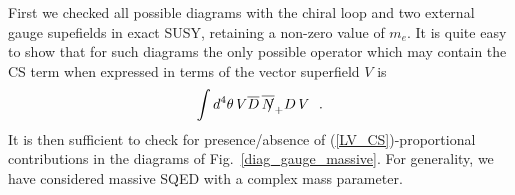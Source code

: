 \documentclass[12pt]{revtex4}
\newcommand{\slashed}[1]{\hbox{{$#1$}\llap{$/$}}}
\begin{document}
First we checked  all possible diagrams with the chiral loop and two 
  external gauge supefields in exact SUSY, retaining a non-zero value of $m_e$. 
It is quite easy to show that for such diagrams the only possible operator 
which may contain the CS term when expressed in terms
of the vector superfield $ V $ is
\begin{equation}
\label{LV_CS}
\int d^4\theta \, V \overline{D}\, \overline{\slashed{N}}_+ D\, V~~.
\end{equation}
        It is then sufficient to check for presence/absence of (\ref{LV_CS})-proportional
contributions in the diagrams of Fig.~\ref{diag_gauge_massive}.
	For generality, we have considered massive SQED with a complex mass parameter.
\end{document}
